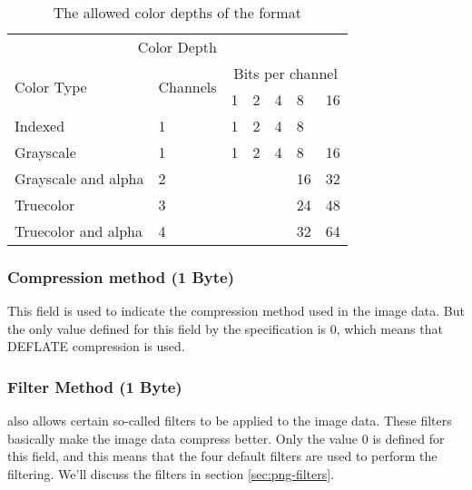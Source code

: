 \begin{table}
  \centering

  \newcommand{\invalid}{\cellcolor{gray}}

  \begin{tabular}{|l|l|l|l|l|l|l|}
    \hline
    \multicolumn{7}{|c|}{Color Depth} \\
    \cline{1-7}
    \multirow{2}{*}{Color Type} & \multirow{2}{*}{Channels} &
    \multicolumn{5}{c|}{Bits per channel} \\

    \cline{3-7}

    & & 1 & 2 & 4 & 8 & 16 \\

    \hline
    Indexed & 1 & 1 & 2 & 4 & 8 & \invalid \\ \hline
    Grayscale & 1 & 1 & 2 & 4 & 8 & 16  \\ \hline
    Grayscale and alpha & 2 & \invalid& \invalid & \invalid & 16 & 32  \\ \hline
    Truecolor & 3 & \invalid & \invalid & \invalid & 24 & 48  \\ \hline
    Truecolor and alpha & 4 & \invalid & \invalid & \invalid & 32 & 64  \\ \hline

    \hline

  \end{tabular}
  \caption{The allowed color depths of the \png format}
  \label{tab:png-color-depths}
\end{table}

\subsubsection*{Compression method (1 Byte)}

This field is used to indicate the compression method used in the
image data. But the only value defined for this field by the \png
specification is $0$, which means that DEFLATE compression is used.

\subsubsection*{Filter Method (1 Byte)}

\png also allows certain so-called filters to be applied to the image
data. These filters basically make the image data compress
better. Only the value $0$ is defined for this field, and this means
that the four default filters are used to perform the filtering. We'll
discuss the filters in section \ref{sec:png-filters}.

